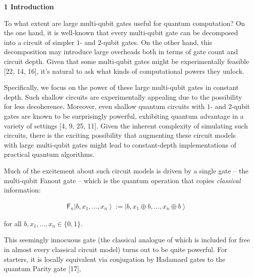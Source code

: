 

\par\medskip\noindent\textbf{
1 Introduction}\par




To what extent are large multi-qubit gates useful for quantum computation? On the one hand, it is well-known that every multi-qubit gate can be decomposed into a circuit of simpler $1$- and $2$-qubit gates. On the other hand, this decomposition may introduce large overheads both in terms of gate count and circuit depth. Given that some multi-qubit gates might be experimentally feasible [22, 14, 16], it’s natural to ask what kinds of computational powers they unlock.\par




Specifically, we focus on the power of these large multi-qubit gates in constant depth. Such shallow circuits are experimentally appealing due to the possibility for less decoherence. Moreover, even shallow quantum circuits with $1$- and $2$-qubit gates are known to be surprisingly powerful, exhibiting quantum advantage in a variety of settings [4, 9, 25, 11]. Given the inherent complexity of simulating such circuits, there is the exciting possibility that augmenting these circuit models with large multi-qubit gates might lead to constant-depth implementations of practical quantum algorithms.\par




Much of the excitement about such circuit models is driven by a single gate – the multi-qubit Fanout gate – which is the quantum operation that copies \emph{classical} information:\par


\[\begin{gathered}
\mathsf{F}_{n}\left|b,x_{1},\ldots,x_{n}\right\rangle:=\left|b,x_{1}\oplus b,\ldots,x_{n}\oplus b\right\rangle
\end{gathered}\]


for all $b,x_{1},\ldots,x_{n}\in\{0,1\}$.\par




This seemingly innocuous gate (the classical analogue of which is included for free in almost every classical circuit model) turns out to be quite powerful. For starters, it is locally equivalent via conjugation by Hadamard gates to the quantum Parity gate [17],\par


